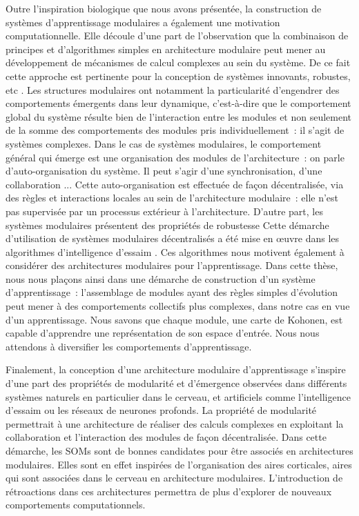 Outre l'inspiration biologique que nous avons présentée, la construction de systèmes d'apprentissage modulaires a également une motivation computationnelle.
Elle découle d'une part de l'observation que la combinaison de principes et d'algorithmes simples en architecture modulaire peut mener au développement de mécanismes de calcul complexes au sein du système. De ce fait cette approche est pertinente pour la conception de systèmes innovants, robustes, etc \cite{chen_modularity_2016}.
Les structures modulaires ont notamment la particularité d'engendrer des comportements émergents dans leur dynamique, c'est-à-dire que le comportement global du système résulte bien de l'interaction entre les modules et non seulement de la somme des comportements des modules pris individuellement~: il s'agit de systèmes complexes.
Dans le cas de systèmes modulaires, le comportement général qui émerge est une organisation des modules de l'architecture~: on parle d'auto-organisation du système. Il peut s'agir d'une synchronisation, d'une collaboration ...
Cette auto-organisation est effectuée de façon décentralisée, via des règles et interactions locales au sein de l'architecture modulaire~: elle n'est pas supervisée par un processus extérieur à l'architecture.
D'autre part, les systèmes modulaires présentent des propriétés de robustesse
\cite{Tang2021ARO}
Cette démarche d'utilisation de systèmes modulaires décentralisés a été mise en \oe{}uvre dans les algorithmes d'intelligence d'essaim \cite{Bonabeau1999SwarmI}. Ces algorithmes nous motivent également à considérer des architectures modulaires pour l'apprentissage.
Dans cette thèse, nous nous plaçons ainsi dans une démarche de construction d'un système d'apprentissage~: l'assemblage de modules ayant des règles simples d'évolution peut mener à des comportements collectifs plus complexes, dans notre cas en vue d'un apprentissage. Nous savons que chaque module, une carte de Kohonen, est capable d'apprendre une représentation de son espace d'entrée. Nous nous attendons à diversifier les comportements d'apprentissage.
\cite{chen_modularity_2016}

Finalement, la conception d'une architecture modulaire d'apprentissage s'inspire d'une part des propriétés de modularité et d'émergence observées dans différents systèmes naturels en particulier dans le cerveau, et artificiels comme l'intelligence d'essaim ou les réseaux de neurones profonds.
La propriété de modularité permettrait à une architecture de réaliser des calculs complexes en exploitant la collaboration et l'interaction des modules de façon décentralisée.
Dans cette démarche, les SOMs sont de bonnes candidates pour être associés en architectures modulaires. Elles sont en effet inspirées de l'organisation des aires corticales, aires qui sont associées dans le cerveau en architecture modulaires. L'introduction de rétroactions dans ces architectures permettra de plus d'explorer de nouveaux comportements computationnels.

